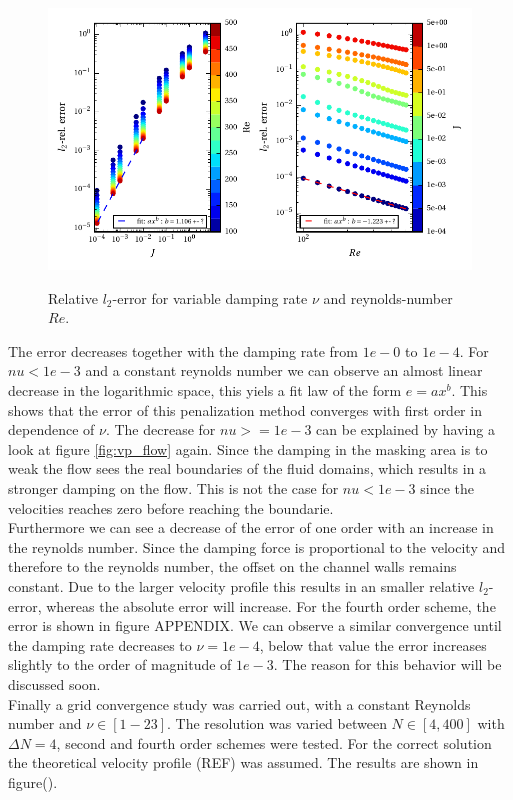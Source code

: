 \begin{figure}[!t]
  \centering
  \includegraphics{gfx/immersed_boundary/poiseuille_flow/2_vp/vp_error.pdf}\label{fig:vp_error}
  \caption{Relative $l_2$-error for variable damping rate $\nu$ and reynolds-number $Re$.}
\end{figure}


The error decreases together with the damping rate from $1e-0$ to $1e-4$. For $nu<1e-3$ and a constant reynolds number we can observe an almost linear decrease in the logarithmic space,
this yiels a fit law of the form $ e = ax^b$. This shows that the error of this penalization method converges with first order in dependence of $\nu$.
The decrease for $nu>=1e-3$ can be explained by having a look at figure \ref{fig:vp_flow} again. Since the damping in the masking area is to
weak the flow sees the real boundaries of the fluid domains, which results in a stronger damping on the flow.
This is not the case for $nu<1e-3$ since the velocities reaches zero before reaching the boundarie.\\
Furthermore we can see a decrease of the error of one order with an increase in the reynolds number.
Since the damping force is proportional to the velocity and therefore to the reynolds number, the offset on the channel walls remains constant.
Due to the larger velocity profile this results in an smaller relative $l_2$-error, whereas the absolute error will increase.
For the fourth order scheme, the error is shown in figure APPENDIX.
We can observe a similar convergence  until the damping rate decreases to $\nu=1e-4$, below that value the error increases slightly to the order of magnitude of $1e-3$.
The reason for this behavior will be discussed soon.\\
Finally a grid convergence study was carried out, with a constant Reynolds number and $\nu \in [1-23]$.
The resolution was varied between $N\in [4, 400]$ with $\Delta N = 4$, second and fourth order schemes were tested.
For the correct solution the theoretical velocity profile (REF) was assumed.
The results are shown in figure().


